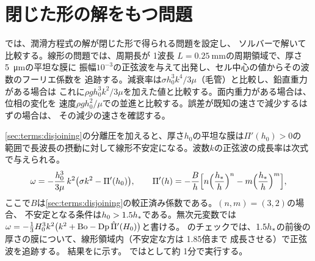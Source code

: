 \section{閉じた形の解をもつ問題}
\label{sec:verification:analytic}

では、潤滑方程式の解が閉じた形で得られる問題を設定し、
ソルバーで解いて比較する。線形の問題では、周期長が 1波長
$L = \SI{0.25}{\milli\metre}$の周期領域で、厚さ\SI{5}{\micro\metre}の平坦な膜に
振幅$10^{-3}$の正弦波を与えて出発し、セル中心の値からその波数のフーリエ係数を
追跡する。減衰率は$\sigma h_0^3 k^4/3\mu$（毛管）と比較し、鉛直重力がある場合は
これに$\rho g h_0^3 k^2/3\mu$を加えた値と比較する。面内重力がある場合は、位相の変化を
速度$\rho g h_0^2/\mu$での並進と比較する。誤差が既知の速さで減少するはずの場合は、
その減少の速さを確認する。

\cref{sec:terms:disjoining}の分離圧を加えると、厚さ$h_0$の平坦な膜は$\Pi'(h_0) > 0$の
範囲で長波長の摂動に対して線形不安定になる。波数$k$の正弦波の成長率は次式で与えられる。
\begin{equation}
  \omega = -\frac{h_0^3}{3\mu}\,k^2\bigl(\sigma k^2 - \Pi'(h_0)\bigr),\qquad
  \Pi'(h) = -\frac{B}{h}\Bigl[n\Bigl(\frac{h_{*}}{h}\Bigr)^{n} - m\Bigl(\frac{h_{*}}{h}\Bigr)^{m}\Bigr],
  \label{eq:spinodal}
\end{equation}
ここで$B$は\cref{sec:terms:disjoining}の較正済み係数である。$(n,m) = (3,2)$の場合、
不安定となる条件は$h_0 > 1.5h_{*}$である。無次元変数では
$\omega = -\tfrac13 H_0^3k^2\bigl(k^2 + \mathrm{Bo} - \mathrm{Dp}\,\hat{\Pi}'(H_0)\bigr)$と書ける。
のチェックでは、$1.5h_{*}$の前後の厚さの膜について、線形領域内（不安定な方は 1.85倍まで
成長させる）で正弦波を追跡する。
結果をに示す。
ではとして約 1分で実行する。

